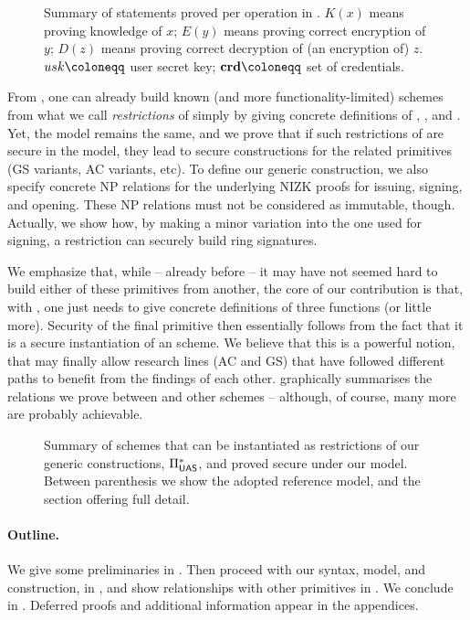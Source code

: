 \begin{figure}[ht!]
  \centering
  \scalebox{0.9}{
    
  }
  \caption{Summary of statements proved per operation in \UAS.
    $K(x)$ means proving knowledge of $x$; $E(y)$ means proving correct
    encryption of $y$; $D(z)$ means proving correct decryption of (an encryption
    of) $z$. $\usk \coloneqq$ user secret key; $\scred \coloneqq$ set of
    credentials.}
  \label{fig:proof-blocks-uas}
\end{figure}

From \CUASGen, one can already build known (and more
functionality-limited) schemes from what we call \emph{restrictions} of
\CUASGen simply by giving concrete definitions of \fissue, \feval, and \finsp.
Yet, the model remains the same, and we prove that if such restrictions of
\CUASGen are secure in the \UAS model, they lead to secure constructions for
the related primitives (GS variants, AC variants, etc). To define our generic
construction, we also specify concrete NP relations for the underlying NIZK
proofs for issuing, signing, and opening. These NP relations must not be
considered as immutable, though. Actually, we show how, by making a minor
variation into the one used for signing, a \CUASGen restriction can securely
build ring signatures.

We emphasize that, while -- already before \UAS -- it may have not seemed hard
to build either of these primitives from another, the core of our contribution
is that, with \UAS, one just needs to give concrete definitions of three
functions (or little more). Security of the final primitive then essentially
follows from the fact that it is a secure instantiation of an \UAS scheme. We
believe that this is a powerful notion, that may finally allow research lines
(AC and GS) that have followed different paths to benefit from the findings of
each other.  graphically summarises the relations we prove
between \UAS and other schemes -- although, of course, many more are probably
achievable.

\begin{figure}[ht!]
  \centering
  \scalebox{0.9}{
    
  }
  \caption{Summary of schemes that can be instantiated as restrictions of our
    generic constructions, $\Pi_{\mathsf{UAS}}^{\ast}$, and proved secure under our \UAS
    model. Between parenthesis we show the adopted reference model, and the
    section offering full detail.}
  \label{fig:relations}
\end{figure}

\paragraph{Outline.} %
We give some preliminaries in . Then proceed with our
\UAS syntax, model, and construction, in , and show
relationships with other primitives in . We conclude
in . Deferred proofs and additional information appear
in the appendices.

